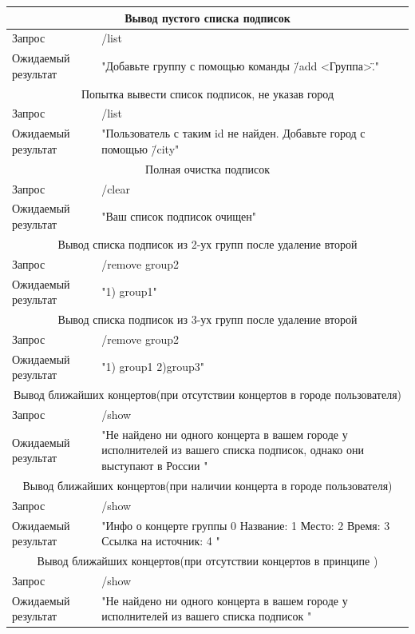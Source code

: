 \begin{table} 
	\begin{center}
		\begin{tabular}{|l|p{10cm}|}
			\hline
			\multicolumn{2}{|c|}{Вывод пустого списка подписок} \\
			\hline
			Запрос & /list \\
			Ожидаемый результат &  "Добавьте группу с помощью команды \"/add <Группа>\"." \\
			\hline
			\multicolumn{2}{|c|}{Попытка вывести список подписок, не указав город} \\
			\hline
			Запрос & /list \\
			Ожидаемый результат &  "Пользователь с таким id не найден. Добавьте город с помощью \"/city" \\
			\hline
			\multicolumn{2}{|c|}{Полная очистка подписок} \\
			\hline
			Запрос & /clear \\
			Ожидаемый результат &  "Ваш список подписок очищен"\\
			\hline
			\multicolumn{2}{|c|}{Вывод списка подписок из 2-ух групп после удаление второй} \\
			\hline
			Запрос & /remove group2 \\
			Ожидаемый результат &  "1) group1"\\
			\hline
			\multicolumn{2}{|c|}{Вывод списка подписок из 3-ух групп после удаление второй} \\
			\hline
			Запрос & /remove group2 \\
			Ожидаемый результат &  "1) group1 2)group3"\\
			\hline
			\multicolumn{2}{|c|}{Вывод ближайших концертов(при отсутствии концертов в городе пользователя)} \\
			\hline
			Запрос & /show\\
			Ожидаемый результат &  "Не найдено ни одного концерта в вашем городе у исполнителей из вашего списка подписок, однако они выступают в России "\\
			\hline
			\multicolumn{2}{|c|}{Вывод ближайших концертов(при наличии концерта в городе пользователя)} \\
			\hline
			Запрос & /show\\
			Ожидаемый результат & "Инфо о концерте группы {0} Название: {1} Место: {2} Время: {3} Ссылка на источник: {4} "\\
			\hline
			\multicolumn{2}{|c|}{Вывод ближайших концертов(при отсутствии концертов в принципе )} \\
			\hline
			Запрос & /show\\
			Ожидаемый результат & "Не найдено ни одного концерта в вашем городе у исполнителей из вашего списка подписок "\\
			\hline
			
			
		\end{tabular}
	\end{center}
\end{table} 
\newpage

